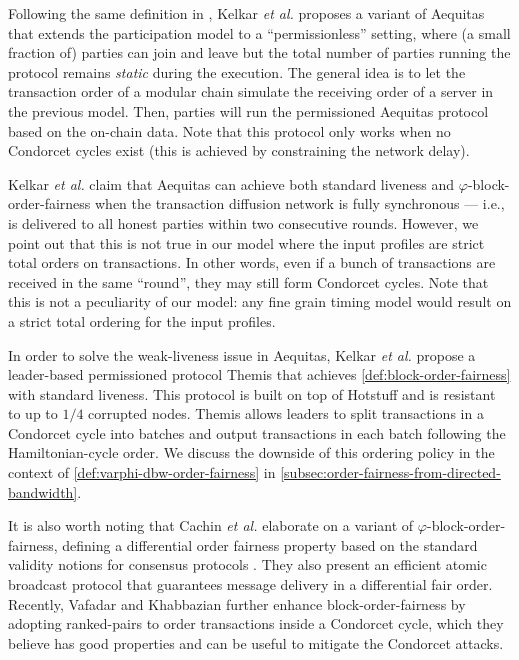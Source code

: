 Following the same definition in \cite{C:KZGJ20}, Kelkar \textit{et al.} \cite{ACCS:KDK22} proposes a variant of \textsf{Aequitas} that extends the participation model to a ``permissionless'' setting,
where (a small fraction of) parties can join and leave but the total number of parties running the protocol remains \emph{static} during the execution.
%
The general idea is to let the transaction order of a modular chain simulate the receiving order of a server in the previous model.
%
Then, parties will run the permissioned \textsf{Aequitas} protocol based on the on-chain data.
%
Note that this protocol only works when no Condorcet cycles exist (this is achieved by constraining the network delay).

\begin{remark}
    Kelkar \textit{et al.} \cite{C:KZGJ20,ACCS:KDK22} claim that \textsf{Aequitas} can achieve both standard liveness and $\varphi$-block-order-fairness when the transaction diffusion network is fully synchronous --- i.e., \tx is delivered to all honest parties within two consecutive rounds.
    However, we point out that this is not true in our model where the input profiles are strict total orders on transactions. In other words, even if a bunch of transactions are received in the same ``round'', they may still form Condorcet cycles. Note that this is not a peculiarity of our model: any fine grain timing model would result on a strict total ordering for the  input profiles.
\end{remark}

In order to solve the weak-liveness issue in \textsf{Aequitas}, Kelkar \textit{et al.} propose a leader-based permissioned protocol \textsf{Themis} \cite{CCS:KDLJK23} that achieves \cref{def:block-order-fairness} with standard liveness.
%
This protocol is built on top of Hotstuff and is resistant to up to $1 / 4$ corrupted nodes.
%
\textsf{Themis} allows leaders to split transactions in a Condorcet cycle into batches and output transactions in each batch following the Hamiltonian-cycle order.
%
We discuss the downside of this ordering policy in the context of \cref{def:varphi-dbw-order-fairness} in \cref{subsec:order-fairness-from-directed-bandwidth}.

It is also worth noting that Cachin \textit{et al.} \cite{FC:CMSZ22} elaborate on a variant of $\varphi$-block-order-fairness, defining a differential order fairness property based on the standard validity notions for consensus protocols \cite{PODC:FitGar03}.
%
They also present an efficient atomic broadcast protocol that guarantees message delivery in a differential fair order.
%
Recently, Vafadar and Khabbazian \cite{AFT:VK23} further enhance block-order-fairness by adopting ranked-pairs to order transactions inside a Condorcet cycle, which they believe has good properties and can be useful to mitigate the Condorcet attacks.
